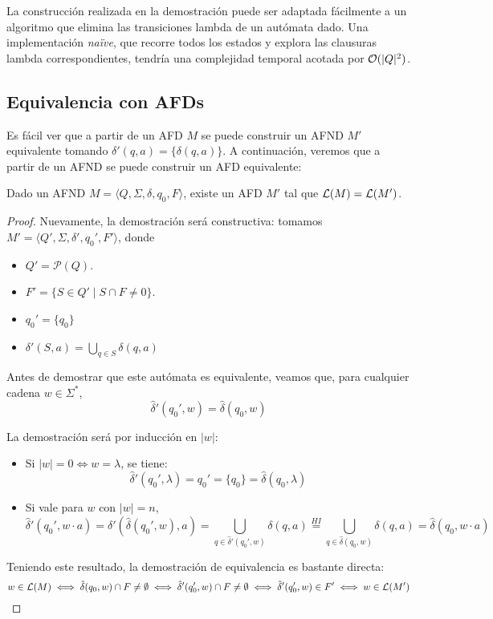 La construcción realizada en la demostración puede ser adaptada fácilmente a un algoritmo que elimina las transiciones lambda de un autómata dado. Una implementación \textit{naïve}, que recorre todos los estados y explora las clausuras lambda correspondientes, tendría una complejidad temporal acotada por $\mathcal{O}(|Q|^2)$.

\subsection{Equivalencia con AFDs}

Es fácil ver que a partir de un AFD $M$ se puede construir un AFND $M'$ equivalente tomando $\delta'(q, a) = \{\delta(q, a)\}$. A continuación, veremos que a partir de un AFND se puede construir un AFD equivalente:

\begin{theorem*}
    Dado un AFND $M = \langle Q, \Sigma, \delta, q_0, F \rangle$, existe un AFD $M'$ tal que $\mathcal{L}(M) = \mathcal{L}(M')$.
\end{theorem*}
\begin{proof}
    Nuevamente, la demostración será constructiva: tomamos $M' = \langle Q', \Sigma, \delta', q_0', F' \rangle$, donde
    \begin{itemize}
        \item $Q' = \mathcal P (Q)$.
        \item $F' = \{S \in Q' \mid S \cap F \neq 0\}$.
        \item $q_0' = \{q_0\}$
        \item $\delta'(S, a) = \bigcup_{q \in S} \delta(q, a)$
    \end{itemize}

    Antes de demostrar que este autómata es equivalente, veamos que, para cualquier cadena $w \in \Sigma^*$,
    $$\hat \delta'(q_0', w) = \hat \delta(q_0, w)$$

    La demostración será por inducción en $|w|$:
    \begin{itemize}
        \item Si $|w| = 0 \iff w = \lambda$, se tiene:
              $$\hat \delta'(q_0', \lambda) = q_0' = \{q_0\} = \hat \delta(q_0, \lambda)$$
        \item Si vale para $w$ con $|w| = n$,
              $$\hat \delta'(q_0', w \cdot a) = \delta'(\hat \delta(q_0', w), a) = \bigcup_{q \in \hat \delta'(q_0', w)} \delta(q, a) \overset{HI}{=} \bigcup_{q \in \hat \delta(q_0, w)} \delta(q, a) = \hat \delta(q_0, w \cdot a)$$
    \end{itemize}

    Teniendo este resultado, la demostración de equivalencia es bastante directa:
    $$w \in \mathcal{L}(M) \iff \hat \delta(q_0, w) \cap F \neq \emptyset \iff \hat \delta'(q_0', w) \cap F \neq \emptyset \iff \hat \delta'(q_0', w) \in F' \iff w \in \mathcal{L}(M')$$
\end{proof}

